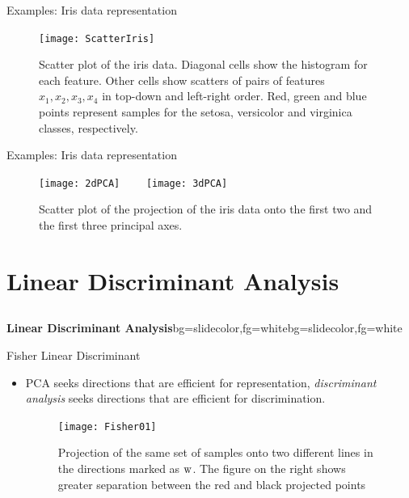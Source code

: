 \begin{frame}{Examples: Iris data representation}
\begin{figure}
\texttt{[image: ScatterIris]}
\caption{Scatter plot of the iris data. Diagonal cells show the histogram for each feature. Other cells show scatters of pairs of features $x_1, x_2, x_3, x_4$ in
top-down and left-right order. Red, green and blue points represent samples for the setosa, versicolor and virginica classes, respectively.}
\end{figure}
\end{frame}

\begin{frame}{Examples: Iris data representation}
\begin{figure}
\texttt{[image: 2dPCA]}~~~~
\texttt{[image: 3dPCA]}
\caption{Scatter plot of the projection of the iris data onto the first two and the first three principal axes.}
\end{figure}
\end{frame}

\section[LDA]{Linear Discriminant Analysis}
\subsection{}

\begin{frame}{}
\begin{variableblock}{\centering \Large \textbf{\vspace{4pt}\newline Linear Discriminant Analysis\vspace{4pt}}}{bg=slidecolor,fg=white}{bg=slidecolor,fg=white}
\end{variableblock}
\end{frame}

\begin{frame}{Fisher Linear Discriminant}
\begin{itemize}
\item PCA seeks directions that are efficient for
representation, \textit{\color{mycolor2}discriminant analysis} seeks directions that are efficient for discrimination.
\begin{figure}
\texttt{[image: Fisher01]}
\caption{Projection of the same set of samples onto two different lines in the directions marked as ${\rm w}$. The figure on the right shows greater separation between the red and black projected points}
\end{figure}
\end{itemize}
\end{frame}

